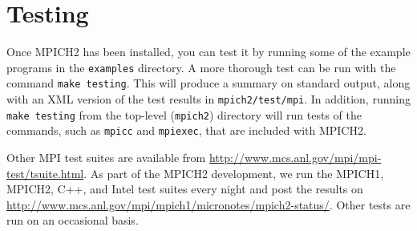 \documentclass[dvipdfm,11pt]{article}
\begin{document}
\section{Testing}
\label{sec:testing}
Once MPICH2 has been installed, you can test it by running some of the example
programs in the \texttt{examples} directory.  A more thorough test can be run
with the command \texttt{make testing}.  This will produce a summary on
standard output, along with an XML version of the test results in 
\texttt{mpich2/test/mpi}. In addition, running \texttt{make testing} from the
top-level (\texttt{mpich2}) directory will run tests of the commands, such as
\texttt{mpicc} and \texttt{mpiexec}, that are included with MPICH2.

Other MPI test suites are available from
\url{http://www.mcs.anl.gov/mpi/mpi-test/tsuite.html}.  As part of the MPICH2
development, we run the MPICH1, MPICH2, C++, and Intel test suites every night
and post the results on
\url{http://www.mcs.anl.gov/mpi/mpich1/micronotes/mpich2-status/}.  Other
tests are run on an occasional basis.  








\end{document}
